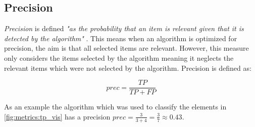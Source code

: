\subsection{Precision}
\label{chp:fundamentals:sec:metrics:subsec:precision}

\textit{Precision} is defined \textit{"as the probability that an item is relevant given that it is detected by the algorithm"} \parencite{Zhu:2004}.
This means when an algorithm is optimized for precision, the aim is that all selected items are relevant.
However, this measure only considers the items selected by the algorithm meaning it neglects the relevant items which were not selected by the algorithm.
Precision is defined as:

\begin{equation}\label{eq:precision}
    prec = \frac{TP}{TP+FP}
\end{equation}

As an example the algorithm which was used to classify the elements in \cref{fig:metrics:tp_vis} has a precision $prec = \frac{3}{3+4} = \frac{3}{7}\approx 0.43$.

